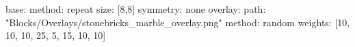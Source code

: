 base:
  method: repeat
  size: [8,8]
  symmetry: none
overlay:
  path: "Blocks/Overlays/stonebricks_marble_overlay.png"
  method: random
  weights: [10, 10, 10, 25, 5, 15, 10, 10]